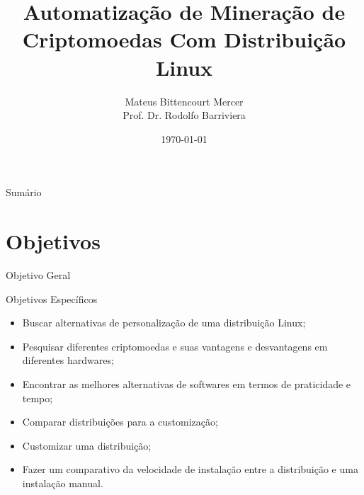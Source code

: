 \documentclass[aspectratio=43]{beamer}
\title{Automatização de Mineração de Criptomoedas Com Distribuição Linux}
\author{Mateus Bittencourt Mercer \\ Prof\@. Dr\@. Rodolfo Barriviera}
\institute{Instituto Federal do Paraná Campus Londrina}
\date{\today}
\begin{document}
\begin{frame}
\titlepage
\end{frame}

\begin{frame}{Sumário}
\tableofcontents
\end{frame}

\section{Objetivos}

\begin{frame}{Objetivo Geral}

\noindent{}

\end{frame}

\begin{frame}{Objetivos Específicos}

\begin{itemize} 

    \item Buscar alternativas de personalização de uma distribuição
        Linux;

    \item Pesquisar diferentes criptomoedas e suas vantagens e
        desvantagens em diferentes hardwares;

    \item Encontrar as melhores alternativas de softwares em termos de
        praticidade e tempo;

    \item Comparar distribuições para a customização;

    \item Customizar uma distribuição;

    \item Fazer um comparativo da velocidade de instalação entre a
distribuição e uma instalação manual.

\end{itemize}
\end{frame}
\end{document}
